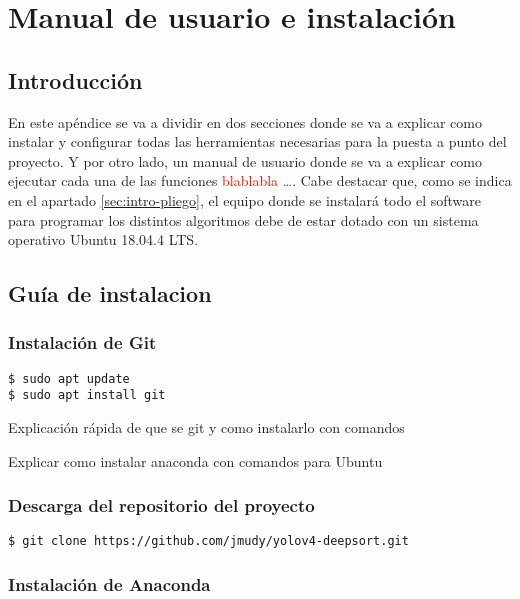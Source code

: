 
\chapter{Manual de usuario e instalación}
\label{cha:manual-usuario-instalacion}

\section{Introducción}
\label{sec:intro-manual-de-usuario}

En este apéndice se va a dividir en dos secciones donde se va a explicar como instalar y configurar todas las herramientas necesarias para la puesta a punto del proyecto. Y por otro lado, un manual de usuario donde se va a explicar como ejecutar cada una de las funciones \textcolor{red}{blablabla \ldots}.
Cabe destacar que, como se indica en el apartado \ref{sec:intro-pliego}, el equipo donde se instalará todo el software para programar los distintos algoritmos debe de estar dotado con un sistema operativo Ubuntu 18.04.4 LTS.


\section{Guía de instalacion}
\label{sec:sec-guia-instalacion}

\subsection{Instalación de Git}
\label{subsec:instalacion-git}

\begin{lstlisting}
$ sudo apt update
$ sudo apt install git
\end{lstlisting}

Explicación rápida de que se git y como instalarlo con comandos

Explicar como instalar anaconda con comandos para Ubuntu

\subsection{Descarga del repositorio del proyecto}
\label{subsec:descarga-repo}

\begin{lstlisting}
$ git clone https://github.com/jmudy/yolov4-deepsort.git
\end{lstlisting}

\subsection{Instalación de Anaconda}
\label{subsec:instalacion-anaconda}

